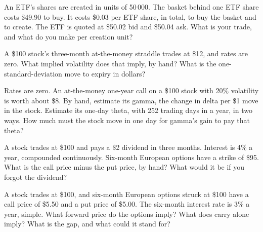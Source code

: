\begin{question}\label{iq:iv2:options-and-bond-arithmetic-at-speed:11}
An ETF's shares are created in units of 50\,000. The basket behind one ETF share costs \$49.90 to buy. It costs \$0.03 per ETF share, in total, to buy the basket and to create. The ETF is quoted at \$50.02 bid and \$50.04 ask. What is your trade, and what do you make per creation unit?
\end{question}

\begin{question}\label{iq:iv2:options-and-bond-arithmetic-at-speed:12}
A \$100 stock's three-month at-the-money straddle trades at \$12, and rates are zero. What implied volatility does that imply, by hand? What is the one-standard-deviation move to expiry in dollars?
\end{question}

\begin{question}\label{iq:iv2:options-and-bond-arithmetic-at-speed:13}
Rates are zero. An at-the-money one-year call on a \$100 stock with 20\% volatility is worth about \$8. By hand, estimate its gamma, the change in delta per \$1 move in the stock. Estimate its one-day theta, with 252 trading days in a year, in two ways. How much must the stock move in one day for gamma's gain to pay that theta?
\end{question}

\begin{question}\label{iq:iv2:options-and-bond-arithmetic-at-speed:14}
A stock trades at \$100 and pays a \$2 dividend in three months. Interest is 4\% a year, compounded continuously. Six-month European options have a strike of \$95. What is the call price minus the put price, by hand? What would it be if you forgot the dividend?
\end{question}

\begin{question}\label{iq:iv2:options-and-bond-arithmetic-at-speed:15}
A stock trades at \$100, and six-month European options struck at \$100 have a call price of \$5.50 and a put price of \$5.00. The six-month interest rate is 3\% a year, simple. What forward price do the options imply? What does carry alone imply? What is the gap, and what could it stand for?
\end{question}

